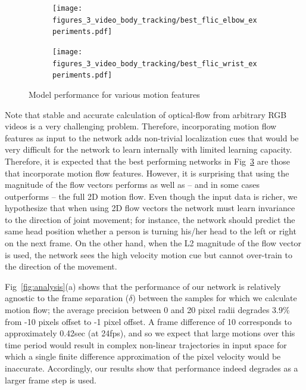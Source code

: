 \begin{figure}[ht]
        \centering
        \begin{subfigure}{0.49\textwidth}
                \centering
                \texttt{[image: figures\_3\_video\_body\_tracking/best\_flic\_elbow\_experiments.pdf]}
                \caption{\footnotesize }
                \label{fig:features_flic_elbow}
        \end{subfigure}
        \begin{subfigure}{0.49\textwidth}
                \centering
                \texttt{[image: figures\_3\_video\_body\_tracking/best\_flic\_wrist\_experiments.pdf]}
                \caption{\footnotesize }
                \label{fig:features_flic_wrist}
        \end{subfigure}
        \caption{Model performance for various motion features}
        \label{fig:features_flic_results}
\end{figure}

Note that stable and accurate calculation of optical-flow from arbitrary RGB videos is a very challenging problem.  Therefore, incorporating motion flow features as input to the network adds non-trivial localization cues that would be very difficult for the network to learn internally with limited learning capacity. Therefore, it is expected that the best performing networks in Fig~\ref{fig:features_flic_results} are those that incorporate motion flow features.  However, it is surprising that using the magnitude of the flow vectors performs as well as -- and in some cases outperforms -- the full 2D motion flow. Even though the input data is richer, we hypothesize that when using 2D flow vectors the network must learn invariance to the direction of joint movement; for instance, the network should predict the same head position  whether a person is turning his/her head to the left or right on the next frame.  On the other hand, when the L2 magnitude of the flow vector is used, the network sees the high velocity motion cue but cannot over-train to the direction of the movement.

Fig~\ref{fig:analysis}(a) shows that the performance of our network is relatively agnostic to the frame separation ($\delta$) between the samples for which we calculate motion flow; the average precision between 0 and 20 pixel radii degrades 3.9\% from -10 pixels offset to -1 pixel offset.  A frame difference of 10 corresponds to approximately 0.42sec (at 24fps), and so we expect that large motions over this time period would result in complex non-linear trajectories in input space for which a single finite difference approximation of the pixel velocity would be inaccurate.  Accordingly, our results show that performance indeed degrades as a larger frame step is used.


